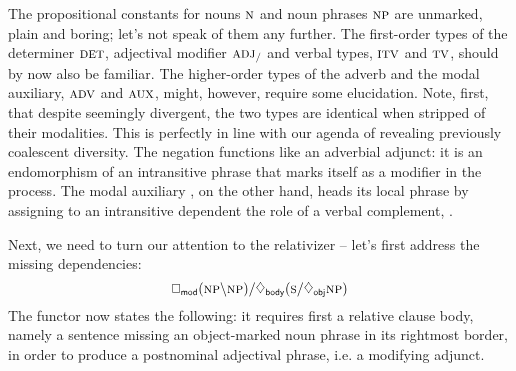 The propositional constants for nouns $\n[s]$ and noun phrases $\np[s]$ are unmarked, plain and boring; let's not speak of them any further.
The first-order types of the determiner $\textsc{\normalfont\textsc{det}}$, adjectival modifier $\textsc{\normalfont\textsc{adj}}_{/}$ and verbal types, $\textsc{\normalfont\textsc{itv}}$ and $\textsc{\normalfont\textsc{tv}}$, should by now also be familiar.
The higher-order types of the adverb and the modal auxiliary, $\textsc{\normalfont\textsc{adv}}$ and $\textsc{\normalfont\textsc{aux}}$, might, however, require some elucidation.
Note, first, that despite seemingly divergent, the two types are identical when stripped of their modalities.
This is perfectly in line with our agenda of revealing previously coalescent diversity.
The negation  functions like an adverbial adjunct: it is an endomorphism of an intransitive phrase that marks itself as a modifier in the process.
The modal auxiliary , on the other hand, heads its local phrase by assigning to an intransitive dependent the role of a verbal complement, .

Next, we need to turn our attention to the relativizer -- let's first address the missing dependencies:
\begin{equation}
\dbox{mod}(\np\divleft\np)\divright\ddia{body}(\s\divright\ddia{obj}\np)\label{equation:deprel}
\end{equation}
The functor now states the following: it requires first a relative clause body, namely a sentence missing an object-marked noun phrase in its rightmost border, in order to produce a postnominal adjectival phrase, i.e. a modifying adjunct.

